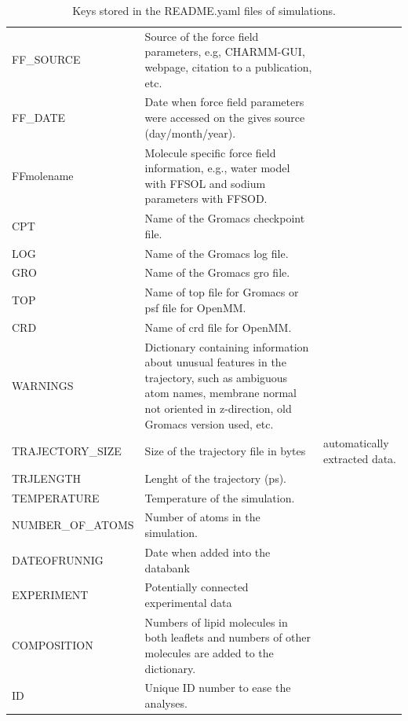 \documentclass[fleqn,10pt]{wlscirep}
\begin{document}
\begin{table}[]
\begin{tabular}{  p{3.5cm}  p{9.5cm}  p{4.0cm} }
    FF\_SOURCE & Source of the force field parameters, e.g, CHARMM-GUI, webpage, citation to a publication, etc. & \\
    FF\_DATE &  Date when force field parameters were accessed on the gives source (day/month/year). & \\
    FF{molename} & Molecule specific force field information, e.g., water model with FFSOL and sodium parameters with FFSOD. & \\
    CPT & Name of the Gromacs checkpoint file. & \\
    LOG & Name of the Gromacs log file. & \\
    GRO & Name of the Gromacs gro file. & \\
    TOP & Name of top file for Gromacs or psf file for OpenMM. & \\
    CRD & Name of crd file for OpenMM. & \\
    WARNINGS & Dictionary containing information about unusual features in the trajectory, such as ambiguous atom names, membrane normal not oriented in z-direction, old Gromacs version used, etc. & \\
    \hline
    TRAJECTORY\_SIZE & Size of the trajectory file in bytes & automatically extracted data. \\
    TRJLENGTH & Lenght of the trajectory (ps). & \\
    TEMPERATURE & Temperature of the simulation. & \\
    NUMBER\_OF\_ATOMS & Number of atoms in the simulation. & \\
    DATEOFRUNNIG & Date when added into the databank & \\
    EXPERIMENT & Potentially connected experimental data & \\
    COMPOSITION & Numbers of lipid molecules in both leaflets and numbers of other molecules are added to the dictionary. & \\
    ID & Unique ID number to ease the analyses. & \\
    \end{tabular}
    \caption{Keys stored in the README.yaml files of simulations.}
    \label{tab:READMEkeys}
\end{table}
\end{document}
